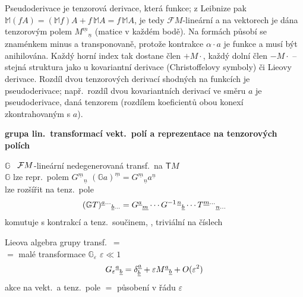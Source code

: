 \begin{vysvetleni}[Pseudoderivace]
Pseudoderivace je tenzorová derivace, která  funkce; z Leibnize pak $\mathbb M(fA)=(\mathbb Mf)A+f\,\mathbb MA=f\,\mathbb MA$, je tedy $\mathcal FM$-lineární a na vektorech je dána tenzorovým polem $M^{\underline m}{}_{\underline n}$ (matice v každém bodě). Na formách působí se znaménkem minus a transponovaně, protože kontrakce $\alpha\cdot a$ je funkce a musí být anihilována. Každý horní index tak dostane člen $+M\cdot$, každý dolní člen $-M\cdot$ -- stejná struktura jako u kovariantní derivace (Christoffelovy symboly) či Lieovy derivace. Rozdíl dvou tenzorových derivací shodných na funkcích je pseudoderivace; např.\ rozdíl dvou kovariantních derivací ve směru $a$ je pseudoderivace, daná tenzorem (rozdílem koeficientů obou konexí zkontrahovaným s $a$).
\end{vysvetleni}

\providecommand{\gmIpG}{\mathbb{G}}
\textbf{grupa lin.\ transformací vekt.\ polí a reprezentace na tenzorových polích}

$\gmIpG$ \ $\mathcal{F} M$-lineární nedegenerovaná transf.\ na $\mathsf{T}M$ \\
\quad $\gmIpG$ lze repr.\ polem $G^{\underline{m}}{}_{\underline{n}}$ \qquad $(\gmIpG a)^{\underline{m}} = G^{\underline{m}}{}_{\underline{n}}a^{\underline{n}}$ \\
lze rozšířit na tenz.\ pole
\[
  (\gmIpG T)^{\gmIpa\dots}{}_{\gmIpb\dots} = G^{\gmIpa}{}_{\underline{m}}\cdots G^{-1\,\underline{n}}{}_{\gmIpb}\cdots T^{\underline{m}\dots}{}_{\underline{n}\dots}
\]
komutuje s kontrakcí a tenz.\ součinem, , triviální na číslech

Lieova algebra grupy transf.\ $=$ \\
\quad $=$ malé transformace $\gmIpG_\varepsilon$ \qquad $\varepsilon\ll 1$
\[
  G_\varepsilon{}^{\underline{a}}{}_{\underline{b}} = \delta^{\underline{a}}_{\underline{b}} + \varepsilon M^{\underline{a}}{}_{\underline{b}} + O(\varepsilon^2)
\]
\quad akce na vekt.\ a tenz.\ pole $=$ působení v řádu $\varepsilon$

